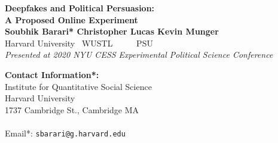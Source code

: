 \documentclass[a0,landscape]{a0poster}
\begin{document}

\begin{minipage}[t]{0.55\linewidth}
\veryHuge \color{DarkRed} 
\textbf{Deepfakes and Political Persuasion: \\ A Proposed Online Experiment} 
\color{Black}\\[1cm] %
\huge \textbf{Soubhik Barari* \quad Christopher Lucas \quad Kevin Munger}\\ %
\huge Harvard University \quad \ WUSTL \ \ \qquad\qquad\quad \ \ \ PSU \\ %
\Large{\textit{Presented at 2020 NYU CESS Experimental Political Science Conference}}
\end{minipage}
%
\begin{minipage}[t]{0.25\linewidth}
\color{DarkSlateGray}\Large \textbf{Contact Information*:}\\
Institute for Quantitative Social Science\\
Harvard University\\
1737 Cambridge St., Cambridge MA\\\\
Email*: \quad \texttt{sbarari@g.harvard.edu}\\ %
\end{minipage}
%

\vspace{1cm} %

\end{document}
